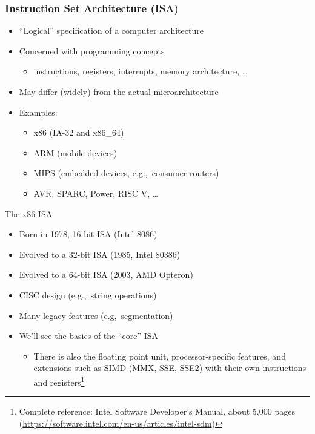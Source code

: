 \documentclass[]{beamer}
\begin{document}
\begin{frame}
	\frametitle{Instruction Set Architecture (ISA)}
	\begin{itemize}
	\item ``Logical'' specification of a computer architecture
	\item Concerned with programming concepts
	\begin{itemize}
		\item instructions, registers, interrupts, memory architecture, \dots
	\end{itemize}
	\item May differ (widely) from the actual microarchitecture
	\item Examples:
		\begin{itemize}
			\item x86 (IA-32 and x86\_64)
			\item ARM (mobile devices)
			\item MIPS (embedded devices, e.g.,~consumer routers)
			\item AVR, SPARC, Power, RISC V, \dots
		\end{itemize}
	\end{itemize}
\end{frame}

\begin{frame}{The x86 ISA}
\begin{itemize}
	\item Born in 1978, 16-bit ISA (Intel 8086)
	\item Evolved to a 32-bit ISA (1985, Intel 80386)
	\item Evolved to a 64-bit ISA (2003, AMD Opteron)
	\item CISC design (e.g.,~string operations)
	\item Many legacy features (e.g,~segmentation)
	\item We'll see the basics of the ``core'' ISA
		\begin{itemize}
			\item There is also the floating point unit, processor-specific features, and extensions such as SIMD (MMX, SSE, SSE2) with their own instructions and registers\footnote{Complete reference: Intel Software Developer's Manual, about 5,000 pages (\url{https://software.intel.com/en-us/articles/intel-sdm})}
		\end{itemize}
\end{itemize}
\end{frame}
\end{document}
